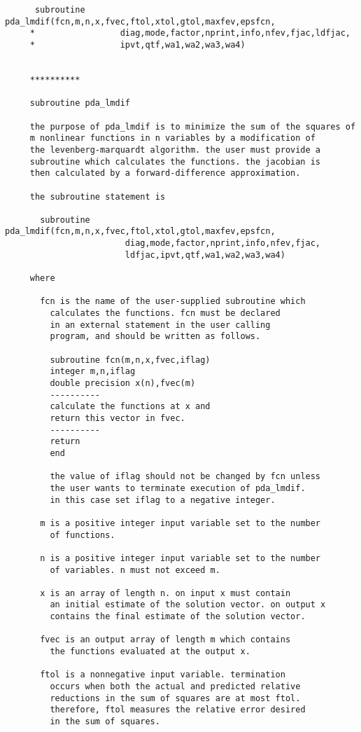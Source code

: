 \begin{verbatim}
      subroutine pda_lmdif(fcn,m,n,x,fvec,ftol,xtol,gtol,maxfev,epsfcn,
     *                 diag,mode,factor,nprint,info,nfev,fjac,ldfjac,
     *                 ipvt,qtf,wa1,wa2,wa3,wa4)


     **********

     subroutine pda_lmdif

     the purpose of pda_lmdif is to minimize the sum of the squares of
     m nonlinear functions in n variables by a modification of
     the levenberg-marquardt algorithm. the user must provide a
     subroutine which calculates the functions. the jacobian is
     then calculated by a forward-difference approximation.

     the subroutine statement is

       subroutine pda_lmdif(fcn,m,n,x,fvec,ftol,xtol,gtol,maxfev,epsfcn,
                        diag,mode,factor,nprint,info,nfev,fjac,
                        ldfjac,ipvt,qtf,wa1,wa2,wa3,wa4)

     where

       fcn is the name of the user-supplied subroutine which
         calculates the functions. fcn must be declared
         in an external statement in the user calling
         program, and should be written as follows.

         subroutine fcn(m,n,x,fvec,iflag)
         integer m,n,iflag
         double precision x(n),fvec(m)
         ----------
         calculate the functions at x and
         return this vector in fvec.
         ----------
         return
         end

         the value of iflag should not be changed by fcn unless
         the user wants to terminate execution of pda_lmdif.
         in this case set iflag to a negative integer.

       m is a positive integer input variable set to the number
         of functions.

       n is a positive integer input variable set to the number
         of variables. n must not exceed m.

       x is an array of length n. on input x must contain
         an initial estimate of the solution vector. on output x
         contains the final estimate of the solution vector.

       fvec is an output array of length m which contains
         the functions evaluated at the output x.

       ftol is a nonnegative input variable. termination
         occurs when both the actual and predicted relative
         reductions in the sum of squares are at most ftol.
         therefore, ftol measures the relative error desired
         in the sum of squares.


\end{verbatim}

